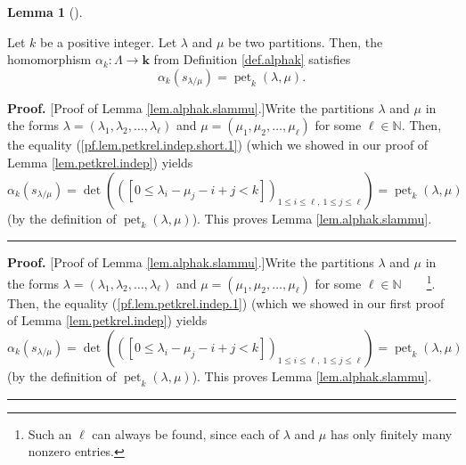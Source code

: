 \documentclass[numbers=enddot,12pt,final,onecolumn,notitlepage]{scrartcl}%
\theoremstyle{definition}
\newtheorem{lem}[theo]{Lemma}
\newenvironment{lemma}[1][]
{\begin{lem}[#1]\begin{leftbar}}
{\end{leftbar}\end{lem}}
\newenvironment{proof}[1][Proof]{\noindent\textbf{#1.} }{\ \rule{0.5em}{0.5em}}
\newenvironment{verlong}{}{}
\newenvironment{vershort}{}{}
\begin{document}
\begin{lemma}
\label{lem.alphak.slammu}Let $k$ be a positive integer. Let $\lambda$ and
$\mu$ be two partitions. Then, the homomorphism $\alpha_{k}:\Lambda
\rightarrow\mathbf{k}$ from Definition \ref{def.alphak} satisfies%
\begin{equation}
\alpha_{k}\left(  s_{\lambda/\mu}\right)  =\operatorname*{pet}\nolimits_{k}%
\left(  \lambda,\mu\right)  . \label{pf.thm.G.pieri.alks}%
\end{equation}

\end{lemma}

\begin{vershort}
\begin{proof}
[Proof of Lemma \ref{lem.alphak.slammu}.]Write the partitions $\lambda$ and
$\mu$ in the forms $\lambda=\left(  \lambda_{1},\lambda_{2},\ldots
,\lambda_{\ell}\right)  $ and $\mu=\left(  \mu_{1},\mu_{2},\ldots,\mu_{\ell
}\right)  $ for some $\ell\in\mathbb{N}$. Then, the equality
(\ref{pf.lem.petkrel.indep.short.1}) (which we showed in our proof of Lemma
\ref{lem.petkrel.indep}) yields%
\[
\alpha_{k}\left(  s_{\lambda/\mu}\right)  =\det\left(  \left(  \left[
0\leq\lambda_{i}-\mu_{j}-i+j<k\right]  \right)  _{1\leq i\leq\ell,\ 1\leq
j\leq\ell}\right)  =\operatorname*{pet}\nolimits_{k}\left(  \lambda
,\mu\right)
\]
(by the definition of $\operatorname*{pet}\nolimits_{k}\left(  \lambda
,\mu\right)  $). This proves Lemma \ref{lem.alphak.slammu}.
\end{proof}
\end{vershort}

\begin{verlong}
\begin{proof}
[Proof of Lemma \ref{lem.alphak.slammu}.]Write the partitions $\lambda$ and
$\mu$ in the forms $\lambda=\left(  \lambda_{1},\lambda_{2},\ldots
,\lambda_{\ell}\right)  $ and $\mu=\left(  \mu_{1},\mu_{2},\ldots,\mu_{\ell
}\right)  $ for some $\ell\in\mathbb{N}$\ \ \ \ \footnote{Such an $\ell$ can
always be found, since each of $\lambda$ and $\mu$ has only finitely many
nonzero entries.}. Then, the equality (\ref{pf.lem.petkrel.indep.1}) (which we
showed in our first proof of Lemma \ref{lem.petkrel.indep}) yields%
\[
\alpha_{k}\left(  s_{\lambda/\mu}\right)  =\det\left(  \left(  \left[
0\leq\lambda_{i}-\mu_{j}-i+j<k\right]  \right)  _{1\leq i\leq\ell,\ 1\leq
j\leq\ell}\right)  =\operatorname*{pet}\nolimits_{k}\left(  \lambda
,\mu\right)
\]
(by the definition of $\operatorname*{pet}\nolimits_{k}\left(  \lambda
,\mu\right)  $). This proves Lemma \ref{lem.alphak.slammu}.
\end{proof}
\end{verlong}
\end{document}
